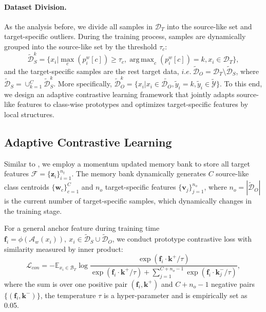 \documentclass{article}
\def\vf{{\bm{f}}}
\def\vk{{\bm{k}}}
\def\vv{{\bm{v}}}
\def\vw{{\bm{w}}}
\def\vz{{\bm{z}}}
\DeclareMathOperator*{\argmax}{arg\,max}
\begin{document}
\paragraph{Dataset Division.}
As the analysis before, we divide all samples in $\mathcal{D}_T$ into the source-like set and target-specific outliers. During the training process, samples are dynamically grouped into the source-like set by the threshold $\tau_c$:
\begin{equation}\label{eq:div_sl2}
    \tilde{\mathcal{D}}_{S}^k= \{x_i | \max_c (p_i^w[c]) \geq \tau_c, \argmax_c (p_i^w[c]) = k, x_i \in \mathcal{D}_T \},
\end{equation}
and the target-specific samples are the rest target data, $i.e.\ \tilde{\mathcal{D}}_{O} = \mathcal{D}_T \setminus \tilde{\mathcal{D}}_{S}$, where $\tilde{\mathcal{D}}_S = \cup_{k=1}^C \tilde{\mathcal{D}}_S^k$. More specifically,
$
    \tilde{\mathcal{D}}_O^k = \{x_i| x_i \in \tilde{\mathcal{D}_O}, \tilde{y}_i=k, \tilde{y}_i \in \tilde{\mathcal{Y}} \}.
$
To this end, we design an adaptive contrastive learning framework that jointly adapts source-like features to class-wise prototypes and optimizes target-specific features by local structures.


\subsection{Adaptive Contrastive Learning}
Similar to \cite{CPC_2018,saito2020dance}, we employ a momentum updated memory bank to store all target features $\mathcal{F} =\{\vz_i\}_{i=1}^{n_t}$. The memory bank dynamically generates $C$ source-like class centroids $\{\vw_c\}_{c=1}^C$ and $n_o$ target-specific features $\{\vv_j\}_{j=1}^{n_o}$, where $n_o = |\tilde{\mathcal{D}}_{O}|$ is the current number of target-specific samples, which dynamically changes in the training stage.

For a general anchor feature during training time $\vf_i = \phi(\mathcal{A}_w(x_i)), \ x_i\in \tilde{\mathcal{D}}_{S}\cup \tilde{\mathcal{D}}_{O}$, we conduct prototype contrastive loss with similarity measured by inner product: 
\begin{equation}
\label{eq:contrastive}
    \mathcal{L}_{con}= -\mathbb{E}_{x_i\in \mathcal{B}_T} \log \frac{\exp(\vf_i \cdot \vk^+/\tau)}
    { \exp{(\vf_i \cdot \vk^+ /\tau)} + \sum_{j= 1}^{C+n_o-1} \exp{(\vf_i \cdot \vk^-_j/\tau)} },
\end{equation}
where the sum is over one positive pair $(\vf_i,\vk^+)$ and $C+n_o-1$ negative pairs $\{(\vf_i, \vk^-)\}$, the temperature $\tau$ is a hyper-parameter and is empirically set as 0.05.
\end{document}

